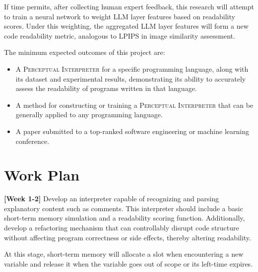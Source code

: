 \documentclass{article}
\begin{document}
If time permits, after collecting human expert feedback, this research will attempt to train a neural network to weight LLM layer features based on readability scores. Under this weighting, the aggregated LLM layer features will form a new code readability metric, analogous to LPIPS in image similarity assessment.

The minimum expected outcomes of this project are:
\begin{itemize}
    \item A \textsc{Perceptual Interpreter} for a specific programming language, along with its dataset and experimental results, demonstrating its ability to accurately assess the readability of programs written in that language.
    \item A method for constructing or training a \textsc{Perceptual Interpreter} that can be generally applied to any programming language.
    \item A paper submitted to a top-ranked software engineering or machine learning conference.
\end{itemize}

\section*{Work Plan}

\textbf{[Week 1-2]} Develop an interpreter capable of recognizing and parsing explanatory content such as comments. This interpreter should include a basic short-term memory simulation and a readability scoring function. Additionally, develop a refactoring mechanism that can controllably disrupt code structure without affecting program correctness or side effects, thereby altering readability. 

At this stage, short-term memory will allocate a slot when encountering a new variable and release it when the variable goes out of scope or its left-time expires.

\begin{figure}[h!]
    \centering
\end{figure}
\end{document}
